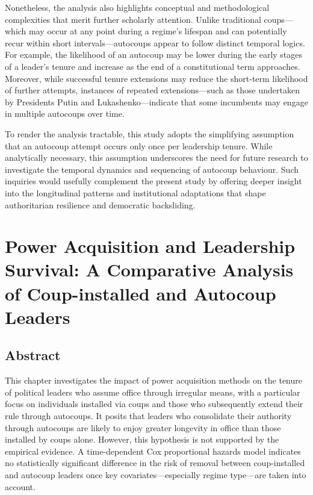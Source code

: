 \documentclass[
  12pt,
]{report}
\begin{document}
Nonetheless, the analysis also highlights conceptual and methodological
complexities that merit further scholarly attention. Unlike traditional
coups---which may occur at any point during a regime's lifespan and can
potentially recur within short intervals---autocoups appear to follow
distinct temporal logics. For example, the likelihood of an autocoup may
be lower during the early stages of a leader's tenure and increase as
the end of a constitutional term approaches. Moreover, while successful
tenure extensions may reduce the short-term likelihood of further
attempts, instances of repeated extensions---such as those undertaken by
Presidents Putin and Lukashenko---indicate that some incumbents may
engage in multiple autocoups over time.

To render the analysis tractable, this study adopts the simplifying
assumption that an autocoup attempt occurs only once per leadership
tenure. While analytically necessary, this assumption underscores the
need for future research to investigate the temporal dynamics and
sequencing of autocoup behaviour. Such inquiries would usefully
complement the present study by offering deeper insight into the
longitudinal patterns and institutional adaptations that shape
authoritarian resilience and democratic backsliding.

\chapter{Power Acquisition and Leadership Survival: A Comparative
Analysis of Coup-installed and Autocoup
Leaders}\label{power-acquisition-and-leadership-survival-a-comparative-analysis-of-coup-installed-and-autocoup-leaders}

\section*{Abstract}\label{abstract-3}

This chapter investigates the impact of power acquisition methods on the
tenure of political leaders who assume office through irregular means,
with a particular focus on individuals installed via coups and those who
subsequently extend their rule through autocoups. It posits that leaders
who consolidate their authority through autocoups are likely to enjoy
greater longevity in office than those installed by coups alone.
However, this hypothesis is not supported by the empirical evidence. A
time-dependent Cox proportional hazards model indicates no statistically
significant difference in the risk of removal between coup-installed and
autocoup leaders once key covariates---especially regime type---are
taken into account.
\end{document}
